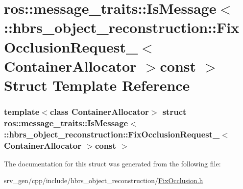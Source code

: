 \hypertarget{structros_1_1message__traits_1_1_is_message_3_01_1_1hbrs__object__reconstruction_1_1_fix_occlusi7c19e074aeaf7145f0487b61f7941c0d}{\section{ros\-:\-:message\-\_\-traits\-:\-:\-Is\-Message$<$ \-:\-:hbrs\-\_\-object\-\_\-reconstruction\-:\-:\-Fix\-Occlusion\-Request\-\_\-$<$ \-Container\-Allocator $>$const $>$ \-Struct \-Template \-Reference}
\label{structros_1_1message__traits_1_1_is_message_3_01_1_1hbrs__object__reconstruction_1_1_fix_occlusi7c19e074aeaf7145f0487b61f7941c0d}
}
\subsubsection*{template$<$class Container\-Allocator$>$ struct ros\-::message\-\_\-traits\-::\-Is\-Message$<$ \-::hbrs\-\_\-object\-\_\-reconstruction\-::\-Fix\-Occlusion\-Request\-\_\-$<$ Container\-Allocator $>$const  $>$}



\-The documentation for this struct was generated from the following file\-:\begin{DoxyCompactItemize}
\item 
srv\-\_\-gen/cpp/include/hbrs\-\_\-object\-\_\-reconstruction/\hyperlink{_fix_occlusion_8h}{\-Fix\-Occlusion.\-h}\end{DoxyCompactItemize}
